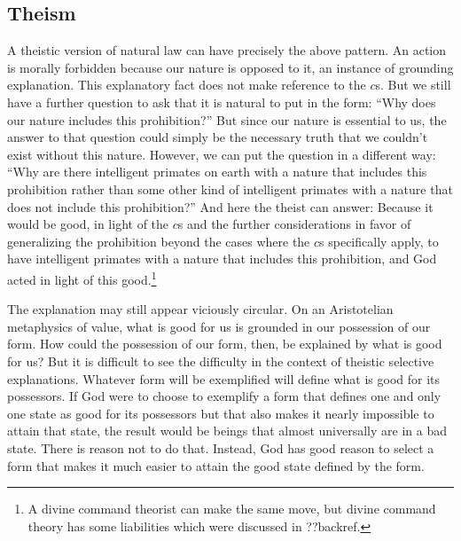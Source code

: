 \subsection{Theism}
A theistic version of natural law can have precisely the above pattern. An action is morally forbidden because
our nature is opposed to it, an instance of grounding explanation. This explanatory fact does not make reference 
to the $c$s. But we still have a further question to ask that it is natural to put in the form: ``Why does our nature 
includes this prohibition?'' But since our nature is essential to us, the answer to that question could 
simply be the necessary truth that we couldn't exist without this nature. However, we can put the question
in a different way: ``Why are there intelligent primates on earth with a nature that includes this prohibition
rather than some other kind of intelligent primates with a nature that does not include this prohibition?''
And here the theist can answer: Because it would be good, in light of the $c$s and the
further considerations in favor of generalizing the prohibition beyond the cases where the $c$s specifically
apply, to have intelligent primates with a nature that includes this prohibition, and God acted in light
of this good.\footnote{A divine command theorist can make the same move, but divine command theory has some
liabilities which were discussed in ??backref.}

The explanation may still appear viciously circular. On an Aristotelian metaphysics of value, what is good for us
is grounded in our possession of our form. How could the possession of our form, then, be explained by what is good 
for us? But it is difficult to see the difficulty in the context of theistic selective explanations. Whatever 
form will be exemplified will define what is good for its possessors. If God were to choose to exemplify a form
that defines one and only one state as good for its possessors but that also makes it nearly impossible to attain
that state, the result would be beings that almost universally are in a bad state. There is reason not to do that.
Instead, God has good reason to select a form that makes it much easier to attain the good state defined by the form.

